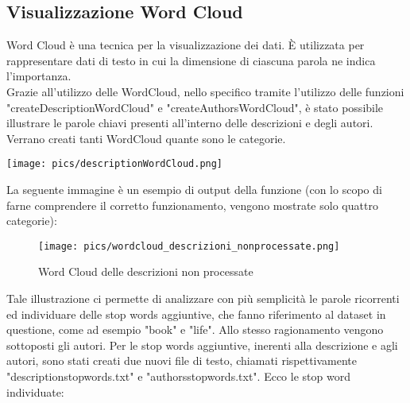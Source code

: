 \documentclass[12pt,oneside]{article}
\begin{document}
    \hfill
    \hfill
    \begin{enumerate}
    \subsection{Visualizzazione Word Cloud}
    \begin{justify}
    Word Cloud è una tecnica per la visualizzazione dei dati. È utilizzata per rappresentare dati di testo in cui la dimensione di ciascuna parola ne indica l'importanza.\\
    Grazie all'utilizzo delle WordCloud, nello specifico tramite l'utilizzo delle funzioni "createDescriptionWordCloud" e "createAuthorsWordCloud", è stato possibile illustrare le parole chiavi presenti all'interno delle descrizioni e degli autori. Verrano creati tanti WordCloud quante sono le categorie.
    \end{justify}
    \texttt{[image: pics/descriptionWordCloud.png]}
    
    \newpage
    \begin{justify}
    La seguente immagine è un esempio di output della funzione (con lo scopo di farne comprendere il corretto funzionamento, vengono mostrate solo quattro categorie):
    \end{justify}
    \begin{figure}[H]
    \centering
    \texttt{[image: pics/wordcloud\_descrizioni\_nonprocessate.png]}
    \caption{Word Cloud delle descrizioni non processate}
    \end{figure}

    \begin{justify}
    Tale illustrazione ci permette di analizzare con più semplicità le parole ricorrenti ed individuare delle stop words aggiuntive, che fanno riferimento al dataset in questione, come ad esempio "book" e "life". Allo stesso ragionamento vengono sottoposti gli autori. Per le stop words aggiuntive, inerenti alla descrizione e agli autori, sono stati creati due nuovi file di testo, chiamati rispettivamente "description\textunderscore{}stopwords.txt" e "authors\textunderscore{}stopwords.txt". Ecco le stop word individuate:
    \end{justify}
    

\end{enumerate}
\end{document}
